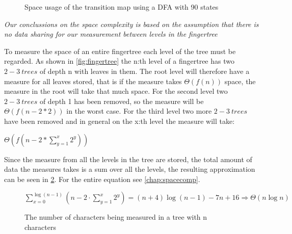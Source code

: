 \begin{figure}[!h]
\caption{Space usage of the transition map using a DFA with 90 states\label{fig:IncSpace}}
\end{figure}

\emph{Our conclussions on the space complexity is based on the assumption that
there is no data sharing for our measurement between levels in the fingertree}

To measure the space of an entire fingertree each level of the tree must be
regarded. As shown
in \cref{fig:fingertree} the n:th level of a fingertree has two $2-3~trees$ of
depth n with leaves in them. The root level will therefore have a measure for
all leaves stored, that is if the measure takes $\Theta(f(n))$ space, the
measure in the root will take that much space. For the second level two
$2-3~trees$ of depth 1 has been removed, so the measure will be $\Theta(f(n-2*2))$
in the worst case. For the third level two more $2-3~trees$ have been removed and
in general on the x:th level the measure will take:
\begin{center}$\Theta(f(n-2*\sum\limits_{y=1}^x2^y))$\end{center}
Since the measure from all the levels in
the tree are stored, the total amount of data the measures takes is a sum over
all the levels, the resulting approximation can be seen in \cref{fig:MeaChar}.
For the entire equation see \cref{chap:spacecomp}.

\begin{figure}[!h]
\begin{center}
$\sum\limits_{x=0}^{\log (n-1)}(n- 2 \cdot \sum\limits_{y=1}^x2^y) =
(n+4)\log(n-1) - 7n + 16 \Rightarrow \Theta(n\log n)$
\end{center}
\caption{The number of characters being measured in a tree with n characters\label{fig:MeaChar}}
\end{figure}

